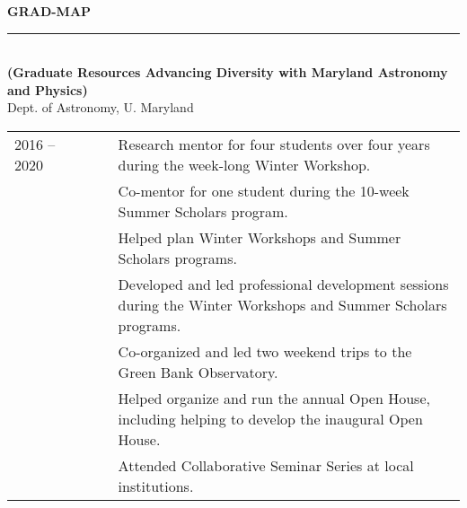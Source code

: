 \documentclass[11pt]{article}
\makeatletter
\newcommand{\tabitem}{~~\llap{\textbullet}~~}
\def\vhrulefill#1{\leavevmode\leaders\hrule \@height #1\hfill \kern\z@}
\newcommand{\subsectionname}[1]{{\large\bf #1 \vhrulefill{0.5pt}}}
\makeatother
\begin{document}
\subsectionname{GRAD-MAP}\\
{\bf (Graduate Resources Advancing Diversity with Maryland Astronomy and Physics)}\\
Dept. of Astronomy, U. Maryland\vspace{-6pt}
\begin{longtable}{p{} p{}p{}}
2016 -- 2020 & \tabitem & Research mentor for four students over four years during the week-long Winter Workshop.\\
& \tabitem & Co-mentor for one student during the 10-week Summer Scholars program.\\
& \tabitem & Helped plan Winter Workshops and Summer Scholars programs.\\
& \tabitem & Developed and led professional development sessions during the Winter Workshops and Summer Scholars programs.\\
& \tabitem & Co-organized and led two weekend trips to the Green Bank Observatory.\\
& \tabitem & Helped organize and run the annual Open House, including helping to develop the inaugural Open House.\\
& \tabitem & Attended Collaborative Seminar Series at local institutions.\medskip\\
\end{longtable}\vspace{-18pt}
\end{document}

